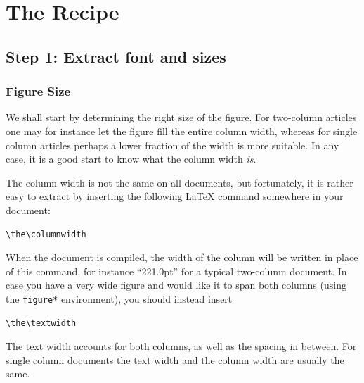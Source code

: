 \documentclass[a4paper,twocolumn]{article}
\begin{document}


\vfill

\section{The Recipe}

\subsection{Step 1: Extract font and sizes}

\subsubsection{Figure Size}
We shall start by determining the right size of the figure.
For two-column articles one may for instance let the figure fill the entire column width, whereas for single column articles perhaps a lower fraction of the width is more suitable.
In any case, it is a good start to know what the column width \emph{is}.

The column width is not the same on all documents, but fortunately, it is rather easy to extract by inserting the following \LaTeX{} command somewhere in your document:
\begin{verbatim}
\the\columnwidth
\end{verbatim}
When the document is compiled, the width of the column will be written in place of this command, for instance ``221.0pt'' for a typical two-column document. 
In case you have a very wide figure and would like it to span both columns (using the \verb|figure*| environment), you should instead insert
\begin{verbatim}
\the\textwidth
\end{verbatim}
The text width accounts for both columns, as well as the spacing in between.
For single column documents the text width and the column width are usually the same.
\end{document}
